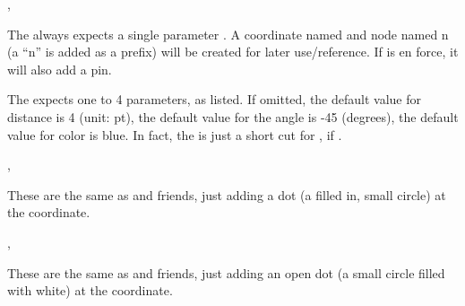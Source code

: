 \documentclass[10pt]{article}
\begin{document}
\begin{codedescribe}{\ncoord,\pincoord}
\begin{codesyntax}%
\tsobj{\ncoord}\tsverb{(}\tsverb{)}
\tsobj{\pincoord}\tsverb{(}\tsverb{)}
\tsobj{\pincoord}\tsverb{(}\tsverb{)}
\tsobj{\pincoord}\tsverb{(}\tsverb{)}
\tsobj{\pincoord}\tsverb{(}\tsverb{)}
\end{codesyntax}
The \tsobj{\ncoord} always expects a single parameter . A coordinate named  and node named n (a ``n'' is added as a prefix) will be created for later use/reference. If \tsobj{\showcoordstrue} is en force, it will also add a pin.

The \tsobj{\pincoord} expects one to 4 parameters, as listed. If omitted, the default value for distance is 4 (unit: pt), the default value for the angle is -45 (degrees), the default value for color is blue.
In fact, the  is just a short cut for , if \tsobj{\showcoordstrue}.
\end{codedescribe}

\begin{codedescribe}{\dotcoord,\dotpincoord}
\begin{codesyntax}%
\tsobj{\dotcoord}\tsverb{(}\tsverb{)}
\tsobj{\dotpincoord}\tsverb{(}\tsverb{)}
\tsobj{\dotpincoord}\tsverb{(}\tsverb{)}
\tsobj{\dotpincoord}\tsverb{(}\tsverb{)}
\tsobj{\dotpincoord}\tsverb{(}\tsverb{)}
\end{codesyntax}
These are the same as \tsobj{\ncoord} and friends, just adding a dot (a filled in, small circle) at the coordinate.
\end{codedescribe}

\begin{codedescribe}{\odotcoord,\odotpincoord}
\begin{codesyntax}%
\tsobj{\odotcoord}\tsverb{(}\tsverb{)}
\tsobj{\odotpincoord}\tsverb{(}\tsverb{)}
\tsobj{\odotpincoord}\tsverb{(}\tsverb{)}
\tsobj{\odotpincoord}\tsverb{(}\tsverb{)}
\tsobj{\odotpincoord}\tsverb{(}\tsverb{)}
\end{codesyntax}
These are the same as \tsobj{\ncoord} and friends, just adding an open dot (a small circle filled with white) at the coordinate.
\end{codedescribe}
\end{document}
